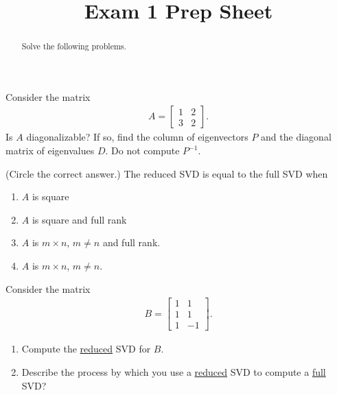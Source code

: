 \documentclass{ximera}
\begin{document}
    \title{Exam 1 Prep Sheet}
    
    \begin{abstract} Solve the following problems.
    \\
    \end{abstract}
    \maketitle


\begin{exercise}
    Consider the matrix
    \begin{align*}
        A = \begin{bmatrix}
            1 & 2 \\3 &2
        \end{bmatrix}.
    \end{align*}
  Is $A$ diagonalizable?  If so, find the column of eigenvectors $P$ and the diagonal matrix of eigenvalues $D$.  Do not compute $P^{-1}$.
\end{exercise}

\begin{exercise}
    (Circle the correct answer.) The reduced SVD is equal to the full SVD when
    \begin{enumerate}
        \item $A$ is square
        \item $A$ is square and full rank
        \item $A$ is $m\times n$, $m \neq n$ and full rank.
        \item $A$ is $m \times n$, $m \neq n$.
    \end{enumerate}
\end{exercise}

\begin{exercise}
Consider the matrix 
\begin{align*}
    B = \begin{bmatrix}
            1 & 1 \\1 &1 \\1 &-1
        \end{bmatrix}.
\end{align*}
\begin{enumerate}
    \item Compute the \underline{reduced} SVD for $B$.
    \item Describe the process by which you use a \underline{reduced} SVD to compute a \underline{full} SVD?
\end{enumerate}
\end{exercise}
\end{document}
